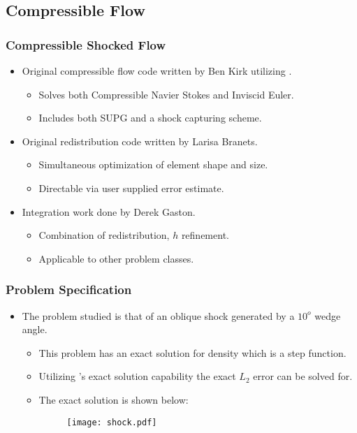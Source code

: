 \subsection*{Compressible Flow}

\frame
{
  \frametitle{Compressible Shocked Flow}
  \begin{itemize}[<+->]
    \item Original compressible flow code written by Ben Kirk utilizing \libMesh{}.
      \begin{itemize}[<+->]
      \item Solves both Compressible Navier Stokes and Inviscid Euler.
      \item Includes both SUPG and a shock capturing scheme.
      \end{itemize}
    \item Original redistribution code written by Larisa Branets.
      \begin{itemize}[<+->]
      \item Simultaneous optimization of element shape and size.
      \item Directable via user supplied error estimate.
      \end{itemize}
    \item Integration work done by Derek Gaston.
      \begin{itemize}[<+->]
      \item Combination of redistribution, $h$ refinement.
      \item Applicable to other problem classes.
      \end{itemize}
  \end{itemize}
}

\frame
{
  \frametitle{Problem Specification}
  \begin{itemize}[<+->]
    \item The problem studied is that of an oblique shock generated by a $10^o$ wedge angle. 
      \begin{itemize}[<+->]
      \item This problem has an exact solution for density which is a step function.
      \item Utilizing \libMesh{}'s exact solution capability the exact
$L_2$ error can be solved for.
      \item The exact solution is shown below:
        \begin{figure}
          \begin{center}
            \texttt{[image: shock.pdf]}
          \end{center}
        \end{figure}
    \end{itemize}
  \end{itemize}
}

